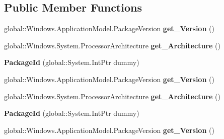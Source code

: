 \subsection*{Public Member Functions}
\begin{DoxyCompactItemize}
\item 
\mbox{\label{class_windows_1_1_application_model_1_1_package_id_a1cd9711edda49a7d975a6956187bb1fc}} 
global\+::\+Windows.\+Application\+Model.\+Package\+Version {\bfseries get\+\_\+\+Version} ()
\item 
\mbox{\label{class_windows_1_1_application_model_1_1_package_id_a80ce33151e556e2ca89d0e54289bd761}} 
global\+::\+Windows.\+System.\+Processor\+Architecture {\bfseries get\+\_\+\+Architecture} ()
\item 
\mbox{\label{class_windows_1_1_application_model_1_1_package_id_a5521aeec07d3e7343d3706b95bab7be0}} 
{\bfseries Package\+Id} (global\+::\+System.\+Int\+Ptr dummy)
\item 
\mbox{\label{class_windows_1_1_application_model_1_1_package_id_a1cd9711edda49a7d975a6956187bb1fc}} 
global\+::\+Windows.\+Application\+Model.\+Package\+Version {\bfseries get\+\_\+\+Version} ()
\item 
\mbox{\label{class_windows_1_1_application_model_1_1_package_id_a80ce33151e556e2ca89d0e54289bd761}} 
global\+::\+Windows.\+System.\+Processor\+Architecture {\bfseries get\+\_\+\+Architecture} ()
\item 
\mbox{\label{class_windows_1_1_application_model_1_1_package_id_a5521aeec07d3e7343d3706b95bab7be0}} 
{\bfseries Package\+Id} (global\+::\+System.\+Int\+Ptr dummy)
\item 
\mbox{\label{class_windows_1_1_application_model_1_1_package_id_a1cd9711edda49a7d975a6956187bb1fc}} 
global\+::\+Windows.\+Application\+Model.\+Package\+Version {\bfseries get\+\_\+\+Version} ()
\item 

\end{DoxyCompactItemize}
